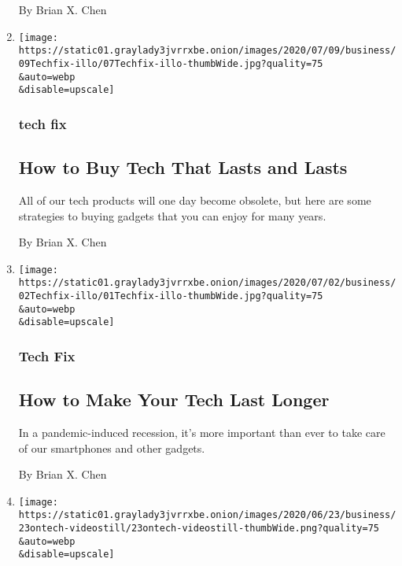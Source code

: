 \begin{enumerate}
  By Brian X. Chen
\item
  \href{/2020/07/08/technology/personaltech/tech-that-lasts.html}{}

  \texttt{[image: https://static01.graylady3jvrrxbe.onion/images/2020/07/09/business/09Techfix-illo/07Techfix-illo-thumbWide.jpg?quality=75\\\&auto=webp\\\&disable=upscale]}

  \hypertarget{tech-fix-3}{%
  \subsubsection{tech fix}\label{tech-fix-3}}

  \hypertarget{how-to-buy-tech-that-lasts-and-lasts}{%
  \subsection{How to Buy Tech That Lasts and
  Lasts}\label{how-to-buy-tech-that-lasts-and-lasts}}

  All of our tech products will one day become obsolete, but here are
  some strategies to buying gadgets that you can enjoy for many years.

  By Brian X. Chen
\item
  \href{/2020/07/01/technology/personaltech/make-your-tech-last-longer.html}{}

  \texttt{[image: https://static01.graylady3jvrrxbe.onion/images/2020/07/02/business/02Techfix-illo/01Techfix-illo-thumbWide.jpg?quality=75\\\&auto=webp\\\&disable=upscale]}

  \hypertarget{tech-fix-4}{%
  \subsubsection{Tech Fix}\label{tech-fix-4}}

  \hypertarget{how-to-make-your-tech-last-longer}{%
  \subsection{How to Make Your Tech Last
  Longer}\label{how-to-make-your-tech-last-longer}}

  In a pandemic-induced recession, it's more important than ever to take
  care of our smartphones and other gadgets.

  By Brian X. Chen
\item
  \href{/2020/06/23/technology/apple-announces-new-privacy-features.html}{}

  \texttt{[image: https://static01.graylady3jvrrxbe.onion/images/2020/06/23/business/23ontech-videostill/23ontech-videostill-thumbWide.png?quality=75\\\&auto=webp\\\&disable=upscale]}


\end{enumerate}
